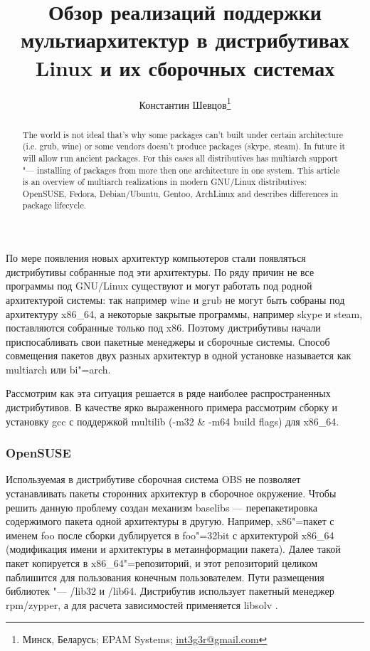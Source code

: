 \documentclass[10pt, a5paper]{article}
\begin{document}
\title{Обзор реализаций поддержки мультиархитектур в дистрибутивах Linux и их сборочных системах}%

\author{Константин Шевцов\footnote{Минск, Беларусь; EPAM Systems; \url{int3g3r@gmail.com}}}
\maketitle

\begin{abstract}
The world is not ideal that's why some packages can't built under certain architecture (i.e. grub, wine) or some vendors doesn't produce packages (skype, steam). In future it will allow run ancient packages.
For this cases all distributives has multiarch support "--- installing of packages from more then one architecture in one system.
This article is an overview of multiarch realizations in modern GNU/Linux distributives: OpenSUSE, Fedora, Debian/Ubuntu, Gentoo, ArchLinux and describes differences in package lifecycle.
\end{abstract}

\begin{center}\end{center}

По мере появления новых архитектур компьютеров стали появляться дистрибутивы собранные под эти архитектуры. По ряду причин не все программы под GNU/Linux существуют и могут работать под родной архитектурой системы: так например wine и grub не могут быть собраны под архитектуру x86\_64, а некоторые закрытые программы, например skype и steam, поставляются собранные только под x86. Поэтому дистрибутивы начали приспосабливать свои пакетные менеджеры и сборочные системы. Способ совмещения пакетов двух разных архитектур в одной установке называется как multiarch или bi"=arch.

Рассмотрим как эта ситуация решается в ряде наиболее распространенных дистрибутивов. В качестве ярко выраженного примера рассмотрим сборку и установку gcc с поддержкой multilib (-m32 \& -m64 build flags) для x86\_64.

\subsubsection*{OpenSUSE}

Используемая в дистрибутиве сборочная система OBS \cite{Sha1} не позволяет устанавливать пакеты сторонних архитектур в сборочное окружение. Чтобы решить данную проблему создан механизм baselibs \cite{Sha2} --- перепакетировка содержимого пакета одной архитектуры в другую. Например, x86"=пакет с именем foo после сборки дублируется в foo"=32bit с архитектурой x86\_64 (модификация имени и архитектуры в метаинформации пакета). Далее такой пакет копируется в x86\_64"=репозиторий, и этот репозиторий целиком паблишится для пользования конечным пользователем. Пути размещения библиотек "--- /lib32 и /lib64. Дистрибутив использует пакетный менеджер rpm/zypper, а для расчета зависимостей применяется libsolv \cite{Sha3}.
\end{document}

